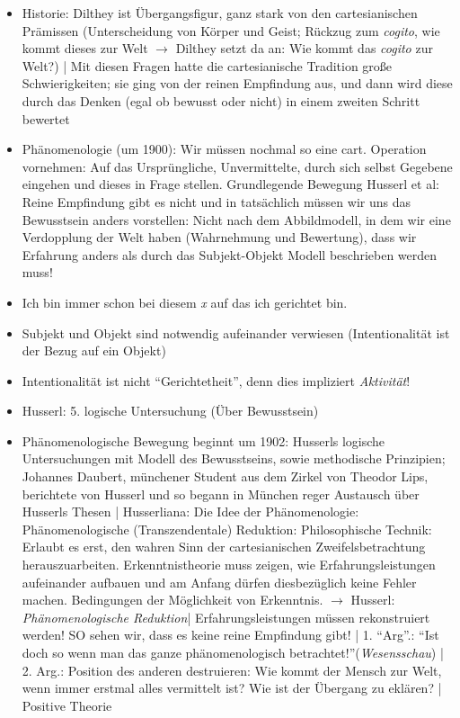 \documentclass[emulatestandardclasses]{scrartcl}
\begin{document}
\begin{itemize}
  \item Historie: Dilthey ist Übergangsfigur, ganz stark von den cartesianischen Prämissen (Unterscheidung von Körper und Geist; Rückzug zum \emph{cogito}, wie kommt dieses zur Welt $\rightarrow$ Dilthey setzt da an: Wie kommt das \emph{cogito} zur Welt?) | Mit diesen Fragen hatte die cartesianische Tradition große Schwierigkeiten; sie ging von der reinen Empfindung aus, und dann wird diese durch das Denken (egal ob bewusst oder nicht) in einem zweiten Schritt bewertet
  \item Phänomenologie (um 1900): Wir müssen nochmal so eine cart. Operation vornehmen: Auf das Ursprüngliche, Unvermittelte, durch sich selbst Gegebene eingehen und dieses in Frage stellen. Grundlegende Bewegung Husserl et al: Reine Empfindung gibt es nicht und in tatsächlich müssen wir uns das Bewusstsein anders vorstellen: Nicht nach dem Abbildmodell, in dem wir eine Verdopplung der Welt haben (Wahrnehmung und Bewertung), dass wir Erfahrung anders als durch das Subjekt-Objekt Modell beschrieben werden muss!
  \item Ich bin immer schon bei diesem \emph{x} auf das ich gerichtet bin.
  \item Subjekt und Objekt sind notwendig aufeinander verwiesen (Intentionalität ist der Bezug auf ein Objekt)
  \item Intentionalität ist nicht "`Gerichtetheit"', denn dies impliziert \emph{Aktivität}!
  \item Husserl: 5. logische Untersuchung (Über Bewusstsein)
  \item Phänomenologische Bewegung beginnt um 1902: Husserls logische Untersuchungen mit Modell des Bewusstseins, sowie methodische Prinzipien; Johannes Daubert, münchener Student aus dem Zirkel von Theodor Lips, berichtete von Husserl und so begann in München reger Austausch über Husserls Thesen | Husserliana: Die Idee der Phänomenologie: Phänomenologische (Transzendentale) Reduktion: Philosophische Technik: Erlaubt es erst, den wahren Sinn der cartesianischen Zweifelsbetrachtung herauszuarbeiten. Erkenntnistheorie muss zeigen, wie Erfahrungsleistungen aufeinander aufbauen und am Anfang dürfen diesbezüglich keine Fehler machen. Bedingungen der Möglichkeit von Erkenntnis. $\rightarrow$ Husserl: \emph{Phänomenologische Reduktion}| Erfahrungsleistungen müssen rekonstruiert werden! SO sehen wir, dass es keine reine Empfindung gibt! | 1. "`Arg"'.: "`Ist doch so wenn man das ganze phänomenologisch betrachtet!"'(\emph{Wesensschau}) | 2. Arg.: Position des anderen destruieren: Wie kommt der Mensch zur Welt, wenn immer erstmal alles vermittelt ist? Wie ist der Übergang zu eklären? | Positive Theorie

\end{itemize}
\end{document}
